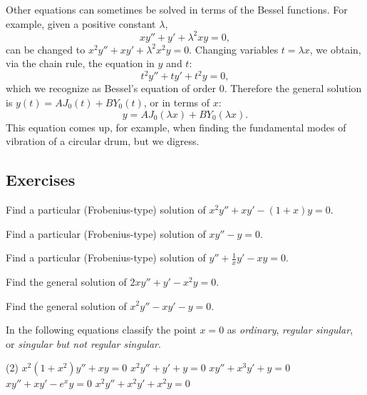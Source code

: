 \begin{example}
Other equations can sometimes be solved in terms of the Bessel functions.
For example, given a positive constant $\lambda$,
\begin{equation*}
x y'' + y' + \lambda^2 x y = 0 ,
\end{equation*}
can be changed to 
$x^2 y'' + x y' + \lambda^2 x^2 y = 0$.  Changing variables
$t = \lambda x$, we obtain, via the chain rule, the equation in $y$ and $t$:
\begin{equation*}
t^2 y'' + t y' + t^2 y = 0 ,
\end{equation*}
which we recognize as Bessel's equation of order $0$.  Therefore the
general solution is $y(t) = A J_0(t) + B Y_0(t)$, or in terms of $x$:
\begin{equation*}
y = A J_0(\lambda x) + B Y_0(\lambda x) .
\end{equation*}
This equation comes up, for example, when finding the fundamental modes of
vibration of a circular drum, but we digress.
\end{example}

\subsection{Exercises}

\begin{exercise}
Find a particular (Frobenius-type) solution of $x^2 y'' + x y' - (1+x) y = 0$.
\end{exercise}

\begin{exercise}
Find a particular (Frobenius-type) solution of $x y'' - y = 0$.
\end{exercise}

\begin{exercise}
Find a particular (Frobenius-type) solution of $y'' +\frac{1}{x}y' - xy = 0$.
\end{exercise}

\begin{exercise}
Find the general solution of $2 x y'' + y' - x^2 y = 0$.
\end{exercise}

\begin{exercise}
Find the general solution of $x^2 y'' - x y' -y = 0$.
\end{exercise}

\begin{exercise}
In the following equations
classify the point $x=0$ as \emph{ordinary}, \emph{regular singular}, or
\emph{singular but not regular singular}.
\begin{tasks}(2)
\task $x^2(1+x^2)y''+xy=0$
\task $x^2y''+y'+y=0$
\task $xy''+x^3y'+y=0$
\task $xy''+xy'-e^xy=0$
\task $x^2y''+x^2y'+x^2y=0$
\end{tasks}
\end{exercise}

